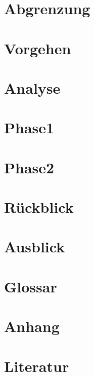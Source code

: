















\part{Abgrenzung}


\part{Vorgehen}


\part{Analyse}


\part{Phase1}


\part{Phase2}


\part{Rückblick}


\part{Ausblick}


\part{Glossar}


\part{Anhang}


\part{Literatur}




